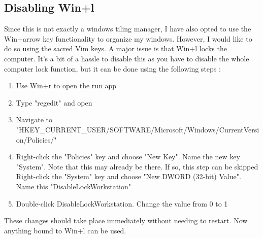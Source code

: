 \subsection{Disabling Win+l}
Since this is not exactly a windows tiling manager, I have also opted to use the
Win+arrow key functionality to organize my windows. However, I would like to do
so using the sacred Vim keys. A major issue is that Win+l locks the computer.
It's a bit of a hassle to disable this as you have to disable the whole computer
lock function, but it can be done using the following steps \cite{glenn2016disable}:
\begin{enumerate}
    \item Use Win+r to open the run app
    \item Type "regedit" and open
    \item Navigate to "HKEY\_CURRENT\_USER/SOFTWARE/Microsoft/Windows/CurrentVersion/Policies/"
    \item Right-click the "Policies" key and choose "New \trangle Key". Name the new
        key "System". Note that this may already be there. If so, this step can
        be skipped Right-click the "System" key and choose "New \trangle DWORD (32-bit)
        Value". Name this "DisableLockWorkstation"
    \item Double-click DisableLockWorkstation. Change the value from 0 to 1
\end{enumerate}
These changes should take place immediately without needing to restart. Now
anything bound to Win+l can be used.

